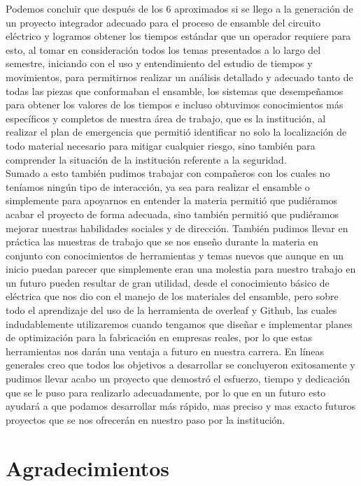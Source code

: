 Podemos concluir que después de los 6 aproximados si se llego a la generación de un proyecto integrador adecuado para el proceso de ensamble del circuito eléctrico y logramos obtener los tiempos estándar que un operador requiere para esto, al tomar en consideración todos los temas presentados a lo largo del semestre, iniciando con el uso y entendimiento del estudio de tiempos y movimientos, para permitirnos realizar un análisis detallado y adecuado tanto de todas las piezas que conformaban el ensamble, los sistemas que desempeñamos para obtener los valores de los tiempos e incluso obtuvimos conocimientos más específicos y completos de nuestra área de trabajo, que es la institución, al realizar el plan de emergencia que permitió identificar no solo la localización de todo material necesario para mitigar cualquier riesgo, sino también para comprender la situación de la institución referente a la seguridad.
\\Sumado a esto también pudimos trabajar con compañeros con los cuales no teníamos ningún tipo de interacción, ya sea  para realizar el ensamble o simplemente para apoyarnos en entender la materia permitió que pudiéramos acabar el proyecto de forma adecuada, sino también permitió que pudiéramos mejorar nuestras habilidades sociales y de dirección. También pudimos llevar en práctica las muestras de trabajo que se nos enseño durante la materia en conjunto con conocimientos de herramientas y temas nuevos que aunque en un inicio puedan parecer que simplemente eran una molestia para nuestro trabajo en un futuro pueden resultar de gran utilidad, desde el conocimiento básico de eléctrica que nos dio con el manejo de los materiales del ensamble, pero sobre todo el aprendizaje del uso de la herramienta de overleaf y Github, las cuales indudablemente utilizaremos cuando tengamos que diseñar e implementar planes de optimización para la fabricación en empresas reales, por lo que estas herramientas nos darán una ventaja a futuro en nuestra carrera. En líneas generales creo que todos los objetivos a desarrollar se concluyeron exitosamente y pudimos llevar acabo un proyecto que demostró el esfuerzo, tiempo y dedicación que se le puso para realizarlo adecuadamente, por lo que en un futuro esto ayudará a que podamos desarrollar más rápido, mas preciso y mas exacto futuros proyectos que se nos ofrecerán en nuestro paso por la institución.
    \section{Agradecimientos}
    
